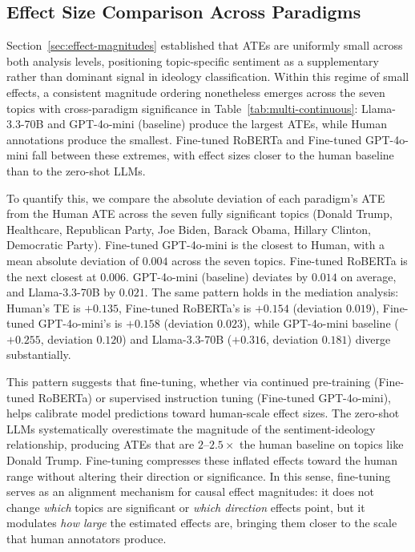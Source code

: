 \subsection{Effect Size Comparison Across Paradigms}

Section~\ref{sec:effect-magnitudes} established that ATEs are uniformly small across both analysis levels, positioning topic-specific sentiment as a supplementary rather than dominant signal in ideology classification. Within this regime of small effects, a consistent magnitude ordering nonetheless emerges across the seven topics with cross-paradigm significance in Table~\ref{tab:multi-continuous}: Llama-3.3-70B and GPT-4o-mini (baseline) produce the largest ATEs, while Human annotations produce the smallest. Fine-tuned RoBERTa and Fine-tuned GPT-4o-mini fall between these extremes, with effect sizes closer to the human baseline than to the zero-shot LLMs.

To quantify this, we compare the absolute deviation of each paradigm's ATE from the Human ATE across the seven fully significant topics (Donald Trump, Healthcare, Republican Party, Joe Biden, Barack Obama, Hillary Clinton, Democratic Party). Fine-tuned GPT-4o-mini is the closest to Human, with a mean absolute deviation of $0.004$ across the seven topics. Fine-tuned RoBERTa is the next closest at $0.006$. GPT-4o-mini (baseline) deviates by $0.014$ on average, and Llama-3.3-70B by $0.021$. The same pattern holds in the mediation analysis: Human's TE is $+0.135$, Fine-tuned RoBERTa's is $+0.154$ (deviation $0.019$), Fine-tuned GPT-4o-mini's is $+0.158$ (deviation $0.023$), while GPT-4o-mini baseline ($+0.255$, deviation $0.120$) and Llama-3.3-70B ($+0.316$, deviation $0.181$) diverge substantially.

This pattern suggests that fine-tuning, whether via continued pre-training (Fine-tuned RoBERTa) or supervised instruction tuning (Fine-tuned GPT-4o-mini), helps calibrate model predictions toward human-scale effect sizes. The zero-shot LLMs systematically overestimate the magnitude of the sentiment-ideology relationship, producing ATEs that are $2$--$2.5\times$ the human baseline on topics like Donald Trump. Fine-tuning compresses these inflated effects toward the human range without altering their direction or significance. In this sense, fine-tuning serves as an alignment mechanism for causal effect magnitudes: it does not change \emph{which} topics are significant or \emph{which direction} effects point, but it modulates \emph{how large} the estimated effects are, bringing them closer to the scale that human annotators produce.

